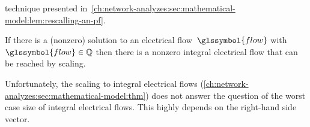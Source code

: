 technique presented
in~\cref{ch:network-analyzes:sec:mathematical-model:lem:rescalling-an-pf}.
% 
% 
% 
\begin{theorem}
    If there is a (nonzero) solution to an electrical flow~$\glssymbol{flow}$
    with~$\glssymbol{flow}\in\rationals$ then there is a nonzero integral
    electrical flow that can be reached by scaling.
    \label{ch:network-analyzes:sec:mathematical-model:thm}
\end{theorem}
%
Unfortunately, the scaling to integral electrical flows
(\cref{ch:network-analyzes:sec:mathematical-model:thm}) does not answer the
question of the worst case size of integral electrical flows. This highly
depends on the right-hand side vector.
% 
% 
%
% 
% 
